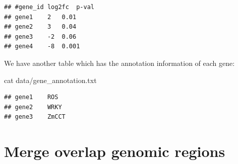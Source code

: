 \documentclass[]{book}
\makeatletter
\newenvironment{Shaded}{\begin{snugshade}}{\end{snugshade}}
\newcommand{\FunctionTok}[1]{\textcolor[rgb]{0.00,0.00,0.00}{#1}}
\newcommand{\NormalTok}[1]{#1}
\newenvironment{kframe}{%
\medskip{}
\setlength{\fboxsep}{.8em}
 \def\at@end@of@kframe{}%
 \ifinner\ifhmode%
  \def\at@end@of@kframe{\end{minipage}}%
  \begin{minipage}{\columnwidth}%
 \fi\fi%
 \def\FrameCommand##1{\hskip\@totalleftmargin \hskip-\fboxsep
 \colorbox{shadecolor}{##1}\hskip-\fboxsep
     \hskip-\linewidth \hskip-\@totalleftmargin \hskip\columnwidth}%
 \MakeFramed {\advance\hsize-\width
   \@totalleftmargin\z@ \linewidth\hsize
   \@setminipage}}%
 {\par\unskip\endMakeFramed%
 \at@end@of@kframe}
\renewenvironment{Shaded}{\begin{kframe}}{\end{kframe}}
\makeatother
\begin{document}
\begin{verbatim}
## #gene_id log2fc  p-val
## gene1    2   0.01
## gene2    3   0.04
## gene3    -2  0.06
## gene4    -8  0.001
\end{verbatim}

We have another table which has the annotation information of each gene:

\begin{Shaded}
\begin{Highlighting}[]
\FunctionTok{cat}\NormalTok{ data/gene_annotation.txt}
\end{Highlighting}
\end{Shaded}

\begin{verbatim}
## gene1    ROS
## gene2    WRKY
## gene3    ZmCCT
\end{verbatim}

\hypertarget{merge-overlap-genomic-regions}{%
\section{Merge overlap genomic regions}\label{merge-overlap-genomic-regions}}
\end{document}
